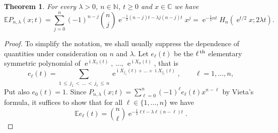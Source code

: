 \documentclass[10pt]{amsart}
\newtheorem{theo}{Theorem}[section]
\theoremstyle{definition}\newtheorem{defi}[theo]{Definition}\newtheorem{rema}[theo]{Remark}\newtheorem{exam}[theo]{Example}\newtheorem{exem}[theo]{Example}\newtheorem{nota}[theo]{Notation}
\DeclareMathOperator{\eee}{e}
\DeclareMathOperator{\ii}{i}
\newcommand{\E}{\mathbb{E}}
\newcommand{\N}{\mathbb{N}}
\newcommand{\C}{\mathbb{C}}
\begin{document}
\begin{theo}\label{theo:expected_char_poly_unitary_BM}
For every $\lambda>0$, $n\in \N$, $t\geq 0$ and $x\in \C$ we have
\[
\E P_{n,\lambda}(x;t) = \sum_{j = 0}^n(-1)^{n-j} \binom n j \eee^{ - \frac 12 (n-j) t - \lambda j (n-j) t} x^{j} =
\eee^{-\frac 12 nt} H_n\left(\eee^{t/2} x ; 2\lambda t\right).
\]
\end{theo}
\begin{proof}
To simplify the notation, we shall usually suppress the dependence of quantities under consideration on $n$ and $\lambda$. Let $e_\ell(t)$ be the $\ell^{\,\text{\normalfont th}}$ elementary symmetric polynomial of $\eee^{\ii X_1(t)},\,\ldots,\,\eee^{\ii X_n(t)}$, that is
\[
e_\ell(t) = \sum_{1\,\leq\,j_1\,<\,\ldots\,<\,j_\ell \,\leq\,n} \eee^{\ii X_{j_1}(t) +\ldots + \ii X_{j_\ell}(t)},
\qquad
\ell = 1,\ldots, n,
\]
Put also $e_0(t) = 1$. Since $P_{n,\lambda}(x;t) = \sum_{\ell = 0}^n (-1)^\ell e_\ell(t) x^{n-\ell}$ by Vieta's formula, it suffices to show that for all $\ell \in \{1,\ldots, n\}$ we have
\[
\E e_\ell(t) = \binom n\ell \eee^{-\frac 1 2 \ell t - \lambda \ell (n-\ell) t}.
\]



\end{proof}
\end{document}
